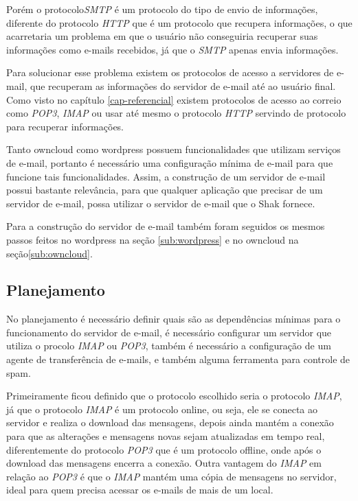 Porém o protocolo\textit{SMTP} é um protocolo do tipo de envio de informações, 
diferente do protocolo \textit{HTTP}
que é um protocolo que recupera informações, o que acarretaria um problema em que
o usuário não conseguiria recuperar suas informações como e-mails recebidos, já
que o \textit{SMTP} apenas envia informações.

Para solucionar esse problema existem os protocolos de acesso a servidores de
e-mail, que recuperam as informações do servidor de e-mail até ao usuário final.
Como visto no capítulo \ref{cap-referencial} existem protocolos de acesso ao correio
como \textit{POP3}, \textit{IMAP} ou usar até mesmo o protocolo \textit{HTTP} 
servindo de protocolo para recuperar informações.

Tanto owncloud como wordpress possuem funcionalidades que utilizam serviços 
de e-mail, portanto
é necessário uma configuração mínima de e-mail para que funcione tais funcionalidades.
Assim, a construção de um servidor de e-mail possui bastante relevância, para que
 qualquer aplicação que precisar de um servidor de e-mail, possa utilizar 
o servidor de e-mail que o Shak fornece.

Para a construção do servidor de e-mail também foram seguidos os mesmos passos
feitos no wordpress na seção  \ref{sub:wordpress} e no owncloud na seção\ref{sub:owncloud}. 

\subsection{Planejamento}

No planejamento é necessário definir
quais são as dependências mínimas para o funcionamento do servidor de e-mail, é 
necessário configurar um servidor que utiliza o procolo \textit{IMAP} ou \textit{POP3},
também é necessário a configuração de um agente de transferência de e-mails, e também
alguma ferramenta para controle de spam.

Primeiramente ficou definido que o protocolo escolhido seria o protocolo \textit{IMAP}, já
que o protocolo \textit{IMAP} é um protocolo online, ou seja, ele se conecta ao servidor
e realiza o download das mensagens, depois ainda  mantém a conexão para que
as alterações e mensagens novas sejam atualizadas em tempo real, diferentemente do
protocolo \textit{POP3} que é um protocolo offline, onde após o download das mensagens encerra
a conexão. Outra vantagem do \textit{IMAP} em relação ao \textit{POP3} é que o 
\textit{IMAP} mantém uma cópia de mensagens no servidor, ideal para quem precisa 
acessar os e-mails de mais de um local.


